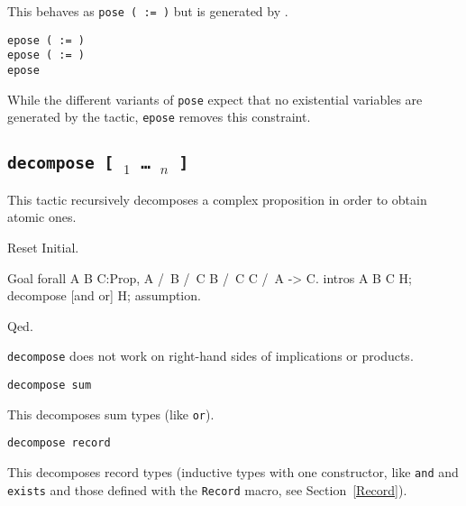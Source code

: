 \begin{coq_example*}
\begin{Variants}
  This behaves as {\tt pose ( {\ident} := {\term} )} but
  {\ident} is generated by {\Coq}.

\item {\tt epose ( {\ident} := {\term} )}\\
      {\tt epose ( {\ident} \nelistnosep{\binder} := {\term} )}\\
      {\tt epose {\term}}

  While the different variants of \texttt{pose} expect that no
  existential variables are generated by the tactic, \texttt{epose}
  removes this constraint.

\end{Variants}

\subsection{\tt decompose [ {\qualid$_1$} \dots\ {\qualid$_n$} ] \term}
\label{decompose}

This tactic recursively decomposes a
complex proposition in order to obtain atomic ones.

\Example

\begin{coq_eval}
Reset Initial.
\end{coq_eval}
\begin{coq_example}
Goal forall A B C:Prop, A /\ B /\ C \/ B /\ C \/ C /\ A -> C.
intros A B C H; decompose [and or] H; assumption.
\end{coq_example}
\begin{coq_example*}
Qed.
\end{coq_example*}

{\tt decompose} does not work on right-hand sides of implications or products.

\begin{Variants}

\item {\tt decompose sum \term}

  This decomposes sum types (like \texttt{or}).

\item {\tt decompose record \term}

  This decomposes record types (inductive types with one constructor,
  like \texttt{and} and \texttt{exists} and those defined with the
  \texttt{Record} macro, see Section~\ref{Record}).

\end{Variants}


\end{coq_example*}
